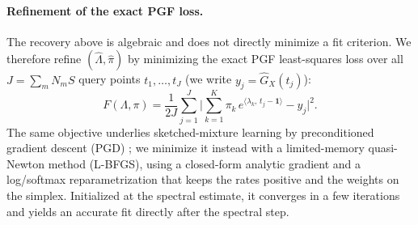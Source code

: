 \documentclass[sigconf,natbib=true,anonymous=true,review=true]{acmart}
\begin{document}
\paragraph{Refinement of the exact PGF loss.}
The recovery above is algebraic and does not directly minimize a fit criterion. We
therefore refine $(\widehat\Lambda,\widehat\pi)$ by minimizing the exact PGF
least-squares loss over all $J=\sum_m N_m S$ query points $t_1,\ldots,t_J$ (we write
$y_j=\widehat G_X(t_j)$):
\begin{equation}
    F(\Lambda,\pi)
    =
    \frac{1}{2J}
    \sum_{j=1}^J
    \Big|
        \sum_{k=1}^K \pi_k\, e^{\langle\lambda_k,\,t_j-\mathbf{1}\rangle}
        -
        y_j
    \Big|^2 .
    \label{eq:refine_loss}
\end{equation}
The same objective underlies sketched-mixture learning by preconditioned gradient
descent (PGD) \cite{gabet2024pgd}; we minimize it instead with a limited-memory
quasi-Newton method (L-BFGS), using a closed-form analytic gradient and a log/softmax
reparametrization that keeps the rates positive and the weights on the simplex.
Initialized at the spectral estimate, it converges in a few iterations and yields an
accurate fit directly after the spectral step.
\end{document}
